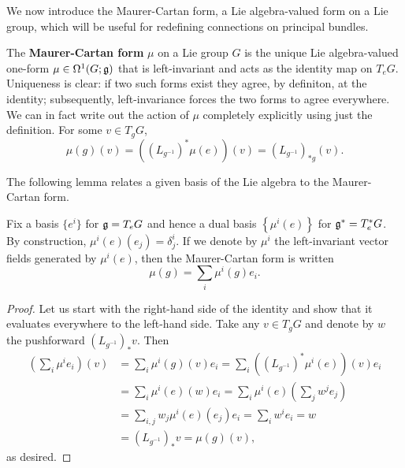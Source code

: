 We now introduce the Maurer-Cartan form, a Lie algebra-valued form on a Lie group, which will be useful for redefining connections on principal bundles.
\begin{defn}
    The \textbf{Maurer-Cartan form} $\mu$ on a Lie group $G$ is the unique Lie algebra-valued one-form $\mu \in \Omega^1(G; \mathfrak g)$
    that is left-invariant and acts as the identity map on $T_eG$. Uniqueness is clear: if two such forms exist they agree, by definiton, at
    the identity; subsequently, left-invariance forces the two forms to agree everywhere. We can in fact write out the action of $\mu$
    completely explicitly using just the definition. For some $v\in T_gG$,
    \[\mu(g)(v)=\left( (L_{g^{-1}})^*\mu(e) \right)(v)=(L_{g^{-1}})_{*g}(v).\]
\end{defn}

The following lemma relates a given basis of the Lie algebra to the Maurer-Cartan form.
\begin{lem}
    \label{LMC}
    Fix a basis $\{e^i\}$ for $\mathfrak g=T_eG$ and hence a dual basis $\left\{ \mu^i(e) \right\}$ for $\mathfrak g^*=T_e^*G$.
    By construction, $\mu^i(e)(e_j)=\delta^i_j$. If we denote by $\mu^i$ the left-invariant vector fields generated by $\mu^i(e)$, then 
    the Maurer-Cartan form is written
    \[\mu(g)=\sum_i\mu^i(g)e_i.\]
\end{lem}
\begin{proof}
    Let us start with the right-hand side of the identity and show that it evaluates everywhere to the left-hand side.
    Take any $v\in T_gG$ and denote by $w$ the pushforward $(L_{g^{-1}})_*v$. Then
    \begin{align*}
        \left(\sum_i\mu^ie_i\right)(v)&=\sum_i\mu^i(g)(v)e_i=\sum_i\left((L_{g^{-1}})^*\mu^i(e)\right)(v)e_i\\
        &=\sum_i \mu^i(e)(w)e_i=\sum_i\mu^i(e)( \sum_j w^j e_j )\\
        &=\sum_{i,j}w_j\mu^i(e)(e_j)e_i=\sum_iw^ie_i=w\\
        &=(L_{g^{-1}})_{*}v=\mu(g)(v),
    \end{align*}
    as desired.
\end{proof}

